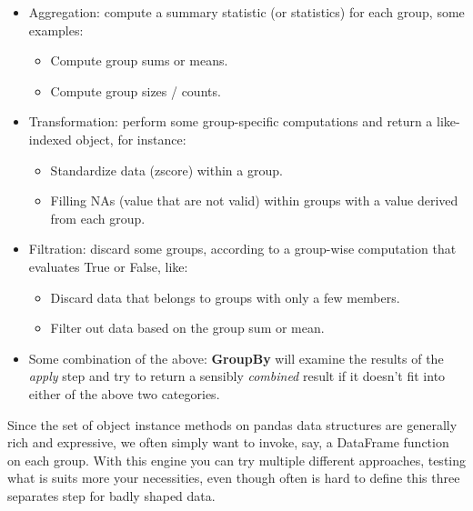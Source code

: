 \begin{itemize}
    \item Aggregation: compute a summary statistic (or statistics) for each group, some examples:
          \begin{itemize}
              \item Compute group sums or means.
              \item Compute group sizes / counts.
          \end{itemize}
    \item Transformation: perform some group-specific computations and return a like-indexed object, for instance:
          \begin{itemize}
              \item Standardize data (zscore) within a group.
              \item Filling NAs (value that are not valid) within groups with a value derived from each group.
          \end{itemize}
    \item Filtration: discard some groups, according to a group-wise computation that evaluates True or False, like:
          \begin{itemize}
              \item Discard data that belongs to groups with only a few members.
              \item Filter out data based on the group sum or mean.
          \end{itemize}
    \item Some combination of the above: \textbf{GroupBy} will examine the results of the \textit{apply} step and try to return a sensibly \textit{combined} result if it doesn’t fit into either of the above two categories.
\end{itemize}
Since the set of object instance methods on pandas data structures are generally rich and expressive, we often simply want to invoke, say, a DataFrame function on each group.
With this engine you can try multiple different approaches, testing what is suits more your necessities, even though often is hard to define this three separates step for badly shaped data.

